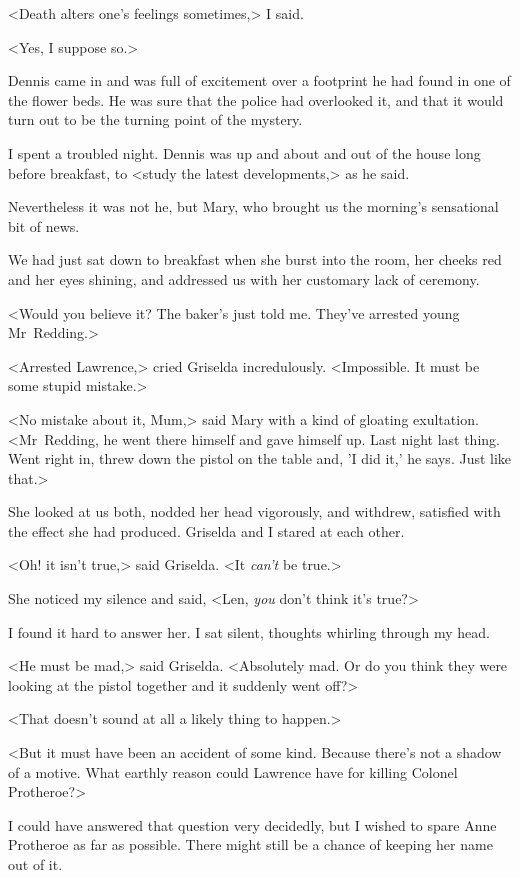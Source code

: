 <Death alters one's feelings sometimes,> I said.

<Yes, I suppose so.>

Dennis came in and was full of excitement over a footprint he had found in one of the flower beds. He was sure that the police had overlooked it, and that it would turn out to be the turning point of the mystery.

I spent a troubled night. Dennis was up and about and out of the house long before breakfast, to <study the latest developments,> as he said.

Nevertheless it was not he, but Mary, who brought us the morning's sensational bit of news.

We had just sat down to breakfast when she burst into the room, her cheeks red and her eyes shining, and addressed us with her customary lack of ceremony.

<Would you believe it? The baker's just told me. They've arrested young Mr~Redding.>

<Arrested Lawrence,> cried Griselda incredulously. <Impossible. It must be some stupid mistake.>

<No mistake about it, Mum,> said Mary with a kind of gloating exultation. <Mr~Redding, he went there himself and gave himself up. Last night last thing. Went right in, threw down the pistol on the table and, 'I did it,' he says. Just like that.>

She looked at us both, nodded her head vigorously, and withdrew, satisfied with the effect she had produced. Griselda and I stared at each other.

<Oh! it isn't true,> said Griselda. <It \emph{can't} be true.>

She noticed my silence and said, <Len, \emph{you} don't think it's true?>

I found it hard to answer her. I sat silent, thoughts whirling through my head.

<He must be mad,> said Griselda. <Absolutely mad. Or do you think they were looking at the pistol together and it suddenly went off?>

<That doesn't sound at all a likely thing to happen.>

<But it must have been an accident of some kind. Because there's not a shadow of a motive. What earthly reason could Lawrence have for killing Colonel Protheroe?>

I could have answered that question very decidedly, but I wished to spare Anne Protheroe as far as possible. There might still be a chance of keeping her name out of it.


